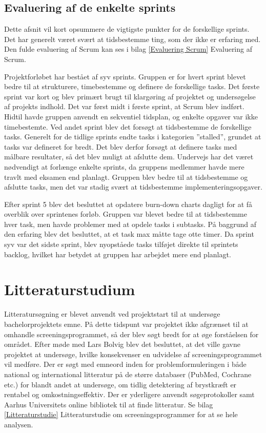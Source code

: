 \subsection{Evaluering af de enkelte sprints} 
Dette afsnit vil kort opsummere de vigtigste punkter for de forskellige sprints. Det har generelt været svært at tidsbestemme ting, som der ikke er erfaring med. Den fulde evaluering af Scrum kan ses i bilag \ref{Evaluering Scrum} Evaluering af Scrum.

Projektforløbet har bestået af syv sprints. Gruppen er for hvert sprint blevet bedre til at strukturere, timebestemme og definere de forskellige tasks. Det første sprint var kort og blev primært brugt til klargøring af projektet og undersøgelse af projekts indhold. Det var først midt i første sprint, at Scrum blev indført. Hidtil havde gruppen anvendt en sekventiel tidsplan, og enkelte opgaver var ikke timebestemte. Ved andet sprint blev det forsøgt at tidsbestemme de forskellige tasks. Generelt for de tidlige sprints endte tasks i kategorien ”stalled”, grundet at tasks var defineret for bredt. Det blev derfor forsøgt at definere tasks med målbare resultater, så det blev muligt at afslutte dem. Undervejs har det været nødvendigt at forlænge enkelte sprints, da gruppens medlemmer havde mere travlt med eksamen end planlagt. Gruppen blev bedre til at tidsbestemme og afslutte tasks, men det var stadig svært at tidsbestemme implementeringsopgaver.

Efter sprint 5 blev det besluttet at opdatere burn-down charts dagligt for at få overblik over sprintenes forløb. Gruppen var blevet bedre til at tidsbestemme hver task, men havde problemer med at opdele tasks i subtasks. På baggrund af den erfaring blev det besluttet, at et task max måtte tage otte timer. Da sprint syv var det sidste sprint, blev nyopståede tasks tilføjet direkte til sprintets backlog, hvilket har betydet at gruppen har arbejdet mere end planlagt.
\newpage
\section{Litteraturstudium}
Litteratursøgning er blevet anvendt ved projektstart til at undersøge bachelorprojektets emne. På dette tidspunt var projektet ikke afgrænset til at omhandle screeningsprogrammet, så der blev søgt bredt for at øge forståelsen for området. Efter møde med Lars Bolvig blev det besluttet, at det ville gavne projektet at undersøge, hvilke konsekvenser en udvidelse af screeningsprogrammet vil medføre. Der er søgt med emneord inden for problemformuleringen i både national og international litteratur på de større databaser (PubMed, Cochrane etc.) for blandt andet at undersøge, om tidlig detektering af brystkræft er rentabel og omkostningseffektiv. Der er yderligere anvendt søgeprotokoller samt Aarhus Universitets online bibliotek til at finde litteratur. Se bilag \ref{Litteraturstudie} Litteraturstudie om screeningsprogrammer for at se hele analysen. 

